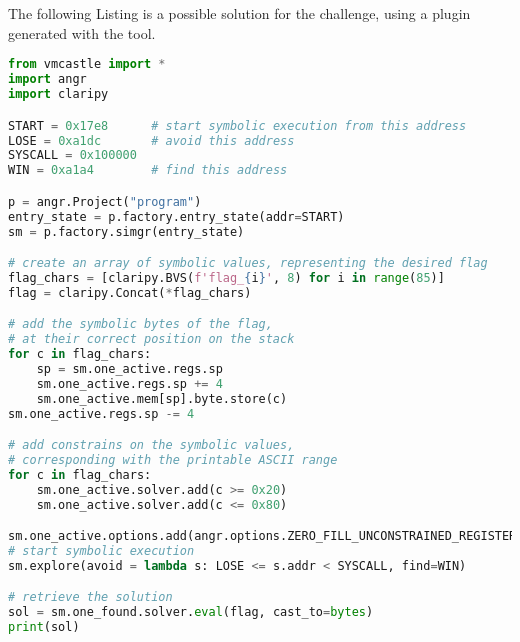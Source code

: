 \chapter{}
\label{anex}

The following Listing is a possible solution for the  challenge, using a plugin generated with the  tool.

\begin{lstlisting}[language=python]
from vmcastle import *
import angr
import claripy

START = 0x17e8      # start symbolic execution from this address
LOSE = 0xa1dc       # avoid this address
SYSCALL = 0x100000 
WIN = 0xa1a4        # find this address

p = angr.Project("program")
entry_state = p.factory.entry_state(addr=START)
sm = p.factory.simgr(entry_state)

# create an array of symbolic values, representing the desired flag
flag_chars = [claripy.BVS(f'flag_{i}', 8) for i in range(85)]
flag = claripy.Concat(*flag_chars)

# add the symbolic bytes of the flag, 
# at their correct position on the stack
for c in flag_chars:
    sp = sm.one_active.regs.sp
    sm.one_active.regs.sp += 4
    sm.one_active.mem[sp].byte.store(c)
sm.one_active.regs.sp -= 4

# add constrains on the symbolic values,
# corresponding with the printable ASCII range
for c in flag_chars:
    sm.one_active.solver.add(c >= 0x20)
    sm.one_active.solver.add(c <= 0x80)

sm.one_active.options.add(angr.options.ZERO_FILL_UNCONSTRAINED_REGISTERS)
# start symbolic execution
sm.explore(avoid = lambda s: LOSE <= s.addr < SYSCALL, find=WIN)

# retrieve the solution
sol = sm.one_found.solver.eval(flag, cast_to=bytes)
print(sol)
\end{lstlisting}
